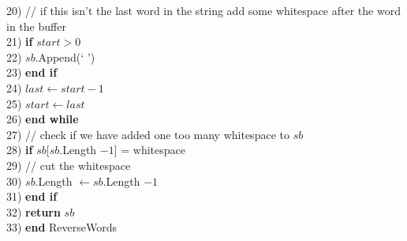 \begin{tabbing}
20)\> \> // if this isn't the last word in the string add some whitespace after the word in the buffer \\
21)\> \> \textbf{if} $start > 0$ \\ 
22)\> \> \> $sb$.Append(` ') \\
23)\> \> \textbf{end if} \\
24)\> \> $last \leftarrow start - 1$ \\
25)\> \> $start \leftarrow last$ \\
26)\> \textbf{end while} \\
27)\> // check if we have added one too many whitespace to $sb$ \\
28)\> \textbf{if} $sb$[$sb$.Length $- 1$] = whitespace \\
29)\> \> // cut the whitespace \\
30)\> \> $sb$.Length $\leftarrow sb$.Length $- 1$ \\
31)\> \textbf{end if} \\
32)\> \textbf{return} $sb$ \\
33) \textbf{end} ReverseWords \\
\end{tabbing}
